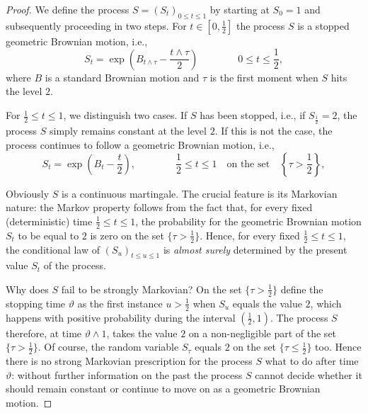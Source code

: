 \documentclass[11pt,a4paper]{article}%
\numberwithin{equation}{section}
\begin{document}
\begin{proof}\label{easyproof}
We define the process $S=(S_t)_{0\le t\le 1}$ by starting at $S_0 = 1$ and subsequently proceeding in two steps. For $t \in [0,\frac{1}{2}]$ the process $S$ is a stopped geometric Brownian motion, i.e.,
\begin{equation} \label{geom}
S_t = \exp \left(B_{t \wedge \tau} -\frac{t \wedge \tau}{2} \right) \qquad \qquad 0\le t\le \frac{1}{2},
\end{equation}
where $B$ is a standard Brownian motion and $\tau$ is the first moment when $S$ hits the level $2$. 

For $\frac{1}{2} \le t \le1$, we distinguish two cases. If $S$ has been stopped, i.e., if $S_{\frac{1}{2}} = 2$, the process $S$ simply remains constant at the level $2$. If this is not the case, the process continues to follow a geometric Brownian motion, i.e.,
\begin{equation} \label{geom2}
S_t = \exp \left(B_t -\frac{t}{2} \right), \qquad \qquad \frac{1}{2} \le t \le 1 \quad \text{on the set} \quad  \left\{\tau > \frac{1}{2}\right\}  ,
\end{equation}

Obviously $S$ is a continuous martingale. The crucial feature is its Markovian nature: the Markov property follows from the fact that, for every fixed (deterministic) time $\frac{1}{2}\le t\le 1$, the probability for the geometric Brownian motion $S_t$  to be equal to $2$ is zero on the set $\{\tau>\frac{1}{2}\}$. Hence, for every fixed $\frac{1}{2} \le t \le 1$, the conditional law of $(S_u)_{t \le u \le 1}$ is \textit{almost surely} determined by the present value $S_t$ of the process.

Why does $S$ fail to be strongly Markovian? On the set $\{\tau > \frac{1}{2}\}$ define the stopping time $\vartheta$ as the first instance $u > \frac{1}{2}$ when $S_u$ equals the value $2$, which happens with positive probability during the interval $\left( \frac{1}{2} , 1 \right)$. The process $S$ therefore, at time $\vartheta \wedge 1$, takes the value $2$ on a non-negligible part of the set $\{\tau > \frac{1}{2}\}$. Of course, the random variable $S_{\tau}$ equals $2$ on the set $\{\tau\le \frac{1}{2}\}$ too. Hence there is no strong Markovian prescription for the process $S$ what to do after time $\vartheta$: without further information on the past the process $S$ cannot decide whether it should remain constant or continue to move on as a geometric Brownian motion.
\end{proof} 
\end{document}
